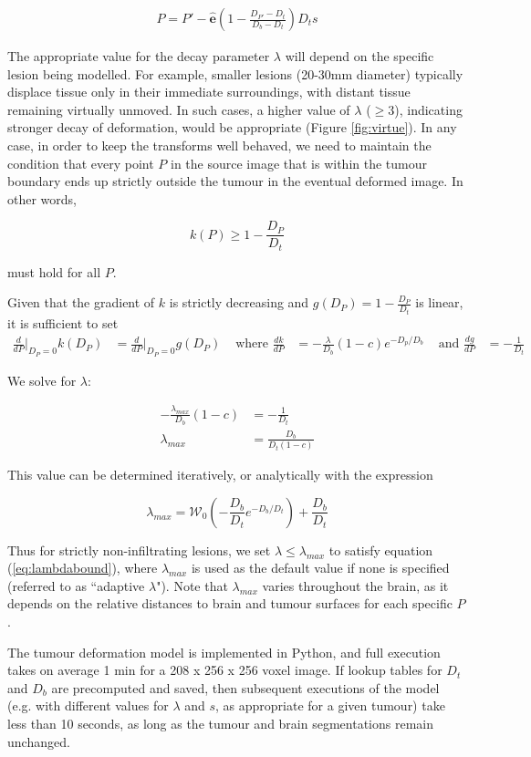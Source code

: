 \begin{align}
  P = P' - \mathbf{\hat{e}}(1-\frac{D_{P'}-D_t}{D_b-D_t})D_ts
\end{align}

The appropriate value for the decay parameter $\lambda$ will depend on the specific lesion being modelled. For example, smaller lesions (20-30mm diameter) typically displace tissue only in their immediate surroundings, with distant tissue remaining virtually unmoved. In such cases, a higher value of $\lambda$ ($\geq 3$), indicating stronger decay of deformation, would be appropriate (Figure \ref{fig:virtue}).
In any case, in order to keep the transforms well behaved, we need to maintain the condition that every point $P$ in the source image that is within the tumour boundary ends up strictly outside the tumour in the eventual deformed image.
In other words,

\begin{equation}\label{eq:lambdabound}
  k(P) \geq 1 - \frac{D_P}{D_t}
\end{equation}

must hold for all $P$.

Given that the gradient of $k$ is strictly decreasing and $g(D_P) = 1 - \frac{D_P}{D_t}$ is linear, it is sufficient to set
\begin{align*}
  \frac{d}{dP}\bigg\rvert_{D_P=0}k(D_P) &= \frac{d}{dP}\bigg\rvert_{D_P=0}g(D_P) &\text{ where } \frac{dk}{dP} &= -\frac{\lambda}{D_b}(1-c)e^{-D_p/D_b} &\text{ and } \frac{dg}{dP} &= -\frac{1}{D_t}
\end{align*}

We solve for $\lambda$:

\begin{align*}
  -\frac{\lambda_{max}}{D_b}(1-c) &= -\frac{1}{D_t} \\
  \lambda_{max} &= \frac{D_b}{D_t (1-c)}
\end{align*}

This value can be determined iteratively, or analytically with the expression

\begin{equation}
  \lambda_{max} = \mathcal{W}_0(-\frac{D_b}{D_t}e^{-D_b/D_t})+\frac{D_b}{D_t}
\end{equation}

Thus for strictly non-infiltrating lesions, we set $\lambda \leq \lambda_{max}$ to satisfy equation (\ref{eq:lambdabound}), where $\lambda_{max}$ is used as the default value if none is specified (referred to as ``adaptive $\lambda$"). 
Note that $\lambda_{max}$ varies throughout the brain, as it depends on the relative distances to brain and tumour surfaces for each specific $P$.

The tumour deformation model is implemented in Python, and full execution takes on average 1 min for a 208 x 256 x 256 voxel image.
If lookup tables for $ D_t$ and $D_b$ are precomputed and saved, then subsequent executions of the model (e.g. with different values for $\lambda$ and $s$, as appropriate for a given tumour) take less than 10 seconds, as long as the tumour and brain segmentations remain unchanged.

